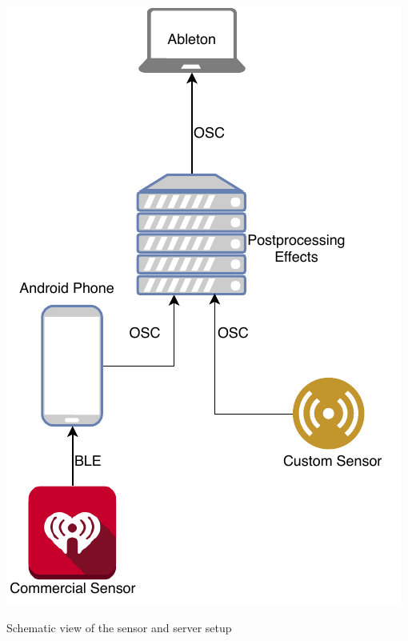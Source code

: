 \documentclass{sigchi-ext}
\begin{document}
\begin{marginfigure}[-36pc]
  \begin{minipage}{\marginparwidth}
    \centering
    \includegraphics[width=0.9\marginparwidth]{figures/topology}
    \caption{Schematic view of the sensor and server setup}
    \label{fig:setup}
  \end{minipage}
\end{marginfigure}
\end{document}
